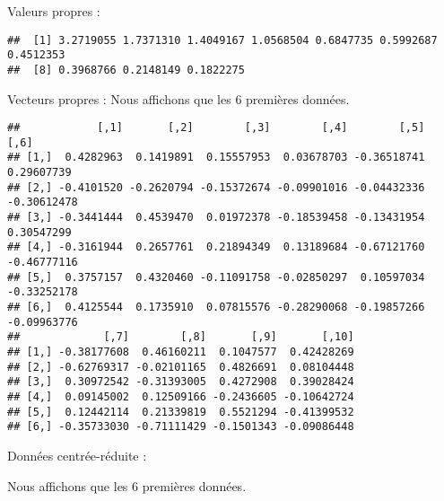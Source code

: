 \documentclass[
]{article}
\newenvironment{Shaded}{\begin{snugshade}}{\end{snugshade}}
\newcommand{\FunctionTok}[1]{\textcolor[rgb]{0.00,0.00,0.00}{#1}}
\newcommand{\NormalTok}[1]{#1}
\newcommand{\SpecialCharTok}[1]{\textcolor[rgb]{0.00,0.00,0.00}{#1}}
\begin{document}
Valeurs propres :

\begin{Shaded}
\end{Shaded}

\begin{verbatim}
##  [1] 3.2719055 1.7371310 1.4049167 1.0568504 0.6847735 0.5992687 0.4512353
##  [8] 0.3968766 0.2148149 0.1822275
\end{verbatim}

Vecteurs propres : Nous affichons que les 6 premières données.

\begin{Shaded}
\end{Shaded}

\begin{verbatim}
##            [,1]       [,2]        [,3]        [,4]        [,5]        [,6]
## [1,]  0.4282963  0.1419891  0.15557953  0.03678703 -0.36518741  0.29607739
## [2,] -0.4101520 -0.2620794 -0.15372674 -0.09901016 -0.04432336 -0.30612478
## [3,] -0.3441444  0.4539470  0.01972378 -0.18539458 -0.13431954  0.30547299
## [4,] -0.3161944  0.2657761  0.21894349  0.13189684 -0.67121760 -0.46777116
## [5,]  0.3757157  0.4320460 -0.11091758 -0.02850297  0.10597034 -0.33252178
## [6,]  0.4125544  0.1735910  0.07815576 -0.28290068 -0.19857266 -0.09963776
##             [,7]        [,8]       [,9]       [,10]
## [1,] -0.38177608  0.46160211  0.1047577  0.42428269
## [2,] -0.62769317 -0.02101165  0.4826691  0.08104448
## [3,]  0.30972542 -0.31393005  0.4272908  0.39028424
## [4,]  0.09145002  0.12509166 -0.2436605 -0.10642724
## [5,]  0.12442114  0.21339819  0.5521294 -0.41399532
## [6,] -0.35733030 -0.71111429 -0.1501343 -0.09086448
\end{verbatim}

Données centrée-réduite :

Nous affichons que les 6 premières données.

\begin{Shaded}
\end{Shaded}
\end{document}
